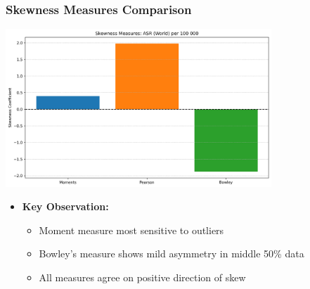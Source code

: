 \begin{frame}
    \frametitle{Skewness Measures Comparison}
    \centering
    \includegraphics[width=0.75\textwidth,height=0.6\textheight,keepaspectratio]{images/graph/skewness_comparison.png}
    \vspace{-0.5em}
    \begin{itemize}
        \item \textbf{Key Observation:}
        \begin{itemize}
            \item Moment measure most sensitive to outliers
            \item Bowley's measure shows mild asymmetry in middle 50\% data
            \item All measures agree on positive direction of skew
        \end{itemize}
    \end{itemize}
\end{frame}